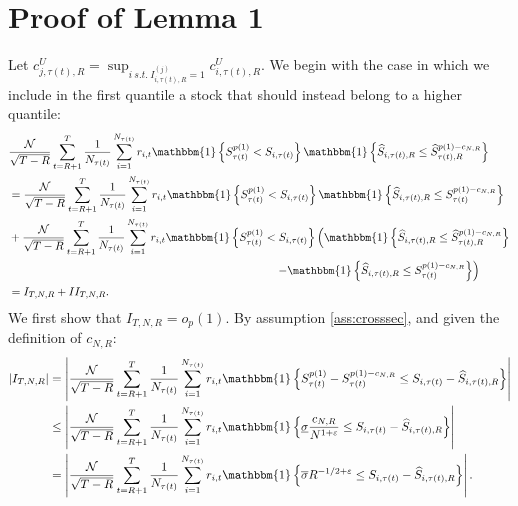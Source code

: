 
\section{Proof of Lemma 1}
\label{Proof of lem:trimerror}

Let $c^U_{j,\tau(t),R} = \sup_{i \ s.t. \ I_{i,\tau(t),R}^{(j)} = 1} c^U_{i,\tau(t),R}$. We begin with the case in which we include in the first quantile a stock that should instead belong to a higher quantile:
\begin{align}
&\frac{\mathcal{N}}{\sqrt{T-R}} \sum_{t=R+1}^{T} \frac{1}{N_{\tau(t)}} \sum_{i=1}^{N_{\tau(t)}} r_{i,t}  \mathbbm{1} \left\{  S_{\tau(t)}^{p(1)} < S_{i,\tau(t)} \right\} \mathbbm{1} \left\{ \widehat{S}_{i,\tau(t),R}\leq \widehat{S}_{\tau(t),R}^{p(1)-c_{N,R}}\right\} \\
&= \frac{\mathcal{N}}{\sqrt{T-R}}\sum_{t=R+1}^{T}\frac{1}{N_{\tau(t)}} \sum_{i=1}^{N_{\tau(t)}} r_{i,t}  \mathbbm{1} \left\{ S_{\tau(t)}^{p(1)} < S_{i,\tau(t)} \right\} \mathbbm{1} \left\{  \widehat{S}_{i,\tau(t),R}\leq S_{\tau(t)}^{p(1)-c_{N,R}} \right\} \notag \\
&+\frac{\mathcal{N}}{\sqrt{T-R}}\sum_{t=R+1}^{T}\frac{1}{N_{\tau(t)}}\sum_{i=1}^{N_{\tau(t)}} r_{i,t}  \mathbbm{1} \left\{ S_{\tau(t)}^{p(1)} < S_{i,\tau(t)} \right\}  \left( \mathbbm{1} \left\{ \widehat{S}_{i,\tau(t),R}\leq \widehat{S}_{\tau(t),R}^{p(1)-c_{N,R}} \right\} \right. \notag \\
&\hspace{8.3cm}\left. -\mathbbm{1} \left\{ \widehat{S}_{i,\tau(t),R}\leq S_{\tau(t)}^{p(1)-c_{N,R}} \right\} \right) \notag \\
&= I_{T,N,R} + II_{T,N,R}. \notag
\end{align}
We first show that $I_{T,N,R}=o_{p}(1)$. By assumption \ref{ass:crosssec}, and given the definition of $c_{N,R}$:
\begin{align}
\left \vert I_{T,N,R} \right \vert &= \left \vert \frac{\mathcal{N}}{\sqrt{T-R}} \sum_{t=R+1}^{T}\frac{1}{N_{\tau(t)}}\sum_{i=1}^{N_{\tau(t)}} r_{i,t} \mathbbm{1} \left\{ S_{\tau(t)}^{p(1)}-S_{\tau(t)}^{p(1)-c_{N,R}} \leq S_{i,\tau(t) }-\widehat{S}_{i,\tau(t),R} \right\} \right \vert \\
&\leq \left \vert \frac{\mathcal{N}}{\sqrt{T-R}} \sum_{t=R+1}^{T}\frac{1}{ N_{\tau(t)}} \sum_{i=1}^{N_{\tau(t)}} r_{i,t} \mathbbm{1} \left\{ \underline{\sigma} \frac{c_{N,R}}{N^{1+\varepsilon }} \leq S_{i,\tau(t) }-\widehat{S}_{i,\tau(t),R} \right\} \right \vert \notag  \\
&= \left \vert \frac{\mathcal{N}}{\sqrt{T-R}}\sum_{t=R+1}^{T}\frac{1}{ N_{\tau(t)}} \sum_{i=1}^{N_{\tau(t)}} r_{i,t} \mathbbm{1} \left\{ \overline{\sigma } R^{-1/2+\varepsilon} \leq S_{i,\tau(t) }-\widehat{S}_{i,\tau(t),R} \right\} \right \vert. \notag 
\end{align}

